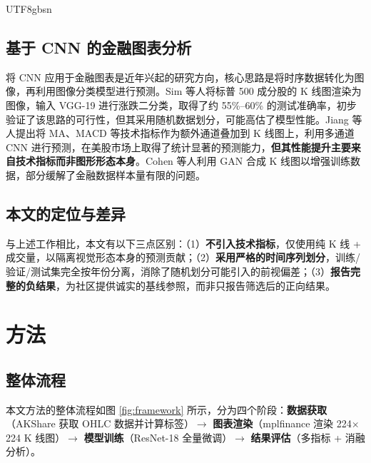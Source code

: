 \documentclass[12pt,a4paper]{article}
\begin{document}
\begin{CJK}{UTF8}{gbsn}
\subsection{基于 CNN 的金融图表分析}

将 CNN 应用于金融图表是近年兴起的研究方向，核心思路是将时序数据转化为图像，再利用图像分类模型进行预测。Sim 等人\cite{sim2019deep}将标普 500 成分股的 K 线图渲染为图像，输入 VGG-19 进行涨跌二分类，取得了约 55\%--60\% 的测试准确率，初步验证了该思路的可行性，但其采用随机数据划分，可能高估了模型性能。Jiang 等人\cite{jiang2023re}提出将 MA、MACD 等技术指标作为额外通道叠加到 K 线图上，利用多通道 CNN 进行预测，在美股市场上取得了统计显著的预测能力，\textbf{但其性能提升主要来自技术指标而非图形形态本身}。Cohen 等人\cite{cohen2022candlestick}利用 GAN 合成 K 线图以增强训练数据，部分缓解了金融数据样本量有限的问题。

\subsection{本文的定位与差异}

与上述工作相比，本文有以下三点区别：（1）\textbf{不引入技术指标}，仅使用纯 K 线 + 成交量，以隔离视觉形态本身的预测贡献；（2）\textbf{采用严格的时间序列划分}，训练/验证/测试集完全按年份分离，消除了随机划分可能引入的前视偏差；（3）\textbf{报告完整的负结果}，为社区提供诚实的基线参照，而非只报告筛选后的正向结果。

\section{方法}

\subsection{整体流程}

本文方法的整体流程如图 \ref{fig:framework} 所示，分为四个阶段：\textbf{数据获取}（AKShare 获取 OHLC 数据并计算标签）$\to$ \textbf{图表渲染}（mplfinance 渲染 224$\times$224 K 线图）$\to$ \textbf{模型训练}（ResNet-18 全量微调）$\to$ \textbf{结果评估}（多指标 + 消融分析）。



\end{CJK}
\end{document}
